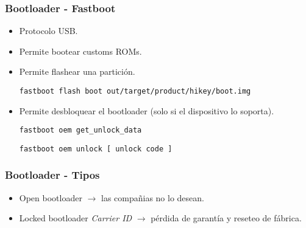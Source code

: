 \begin{frame}[fragile]
  \frametitle{Bootloader - Fastboot}
  \begin{itemize}
      \item Protocolo USB.
      
      \item Permite bootear customs ROMs.
      
      \item Permite flashear una partición.
    \begin{lstlisting}
fastboot flash boot out/target/product/hikey/boot.img
    \end{lstlisting}
      
      \item Permite desbloquear el bootloader (solo si el dispositivo lo soporta).
    \begin{lstlisting}
fastboot oem get_unlock_data
    \end{lstlisting}
    \begin{lstlisting}
fastboot oem unlock [ unlock code ]
    \end{lstlisting}

  \end{itemize}
\end{frame}

\begin{frame}
  \frametitle{Bootloader - Tipos}
  \begin{itemize}
      \item Open bootloader $\rightarrow$ las compañias no lo desean.
      
      \item Locked bootloader \textit{Carrier ID} $\rightarrow$ pérdida de garantía y reseteo de fábrica.
  \end{itemize}
\end{frame}


